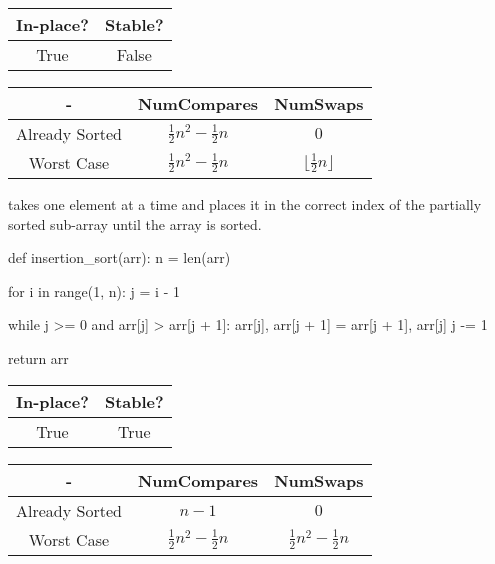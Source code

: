 \begin{center}
  \begin{tabular}{ | c | c | }
    \hline
    In-place? & Stable? \\
    \hline
    True & False \\
    \hline
  \end{tabular}
\end{center}

\begin{center}
  \begin{tabular}{ | c | c | c | }
    \hline
    - & NumCompares & NumSwaps \\
    \hline
    Already Sorted & $\frac{1}{2} n^2 - \frac{1}{2} n$ & $0$ \\
    \hline
    Worst Case &  $\frac{1}{2} n^2 - \frac{1}{2} n$ & $\lfloor \frac{1}{2} n \rfloor$ \\
    \hline
  \end{tabular}
\end{center}

 takes one element at a time and places it in the correct index of the partially sorted sub-array until the array is sorted.

\begin{python}
def insertion_sort(arr):
    n = len(arr)

    for i in range(1, n):
        j = i - 1

        while j >= 0 and arr[j] > arr[j + 1]:
            arr[j], arr[j + 1] = arr[j + 1], arr[j]
            j -= 1

    return arr
\end{python}

\begin{center}
  \begin{tabular}{ | c | c | }
    \hline
    In-place? & Stable? \\
    \hline
    True & True \\
    \hline
  \end{tabular}
\end{center}

\begin{center}
  \begin{tabular}{ | c | c | c | }
    \hline
    - & NumCompares & NumSwaps \\
    \hline
    Already Sorted & $n - 1$ & $0$ \\
    \hline
    Worst Case &  $\frac{1}{2} n^2 - \frac{1}{2} n$ & $\frac{1}{2} n^2 - \frac{1}{2} n$ \\
    \hline
  \end{tabular}
\end{center}

